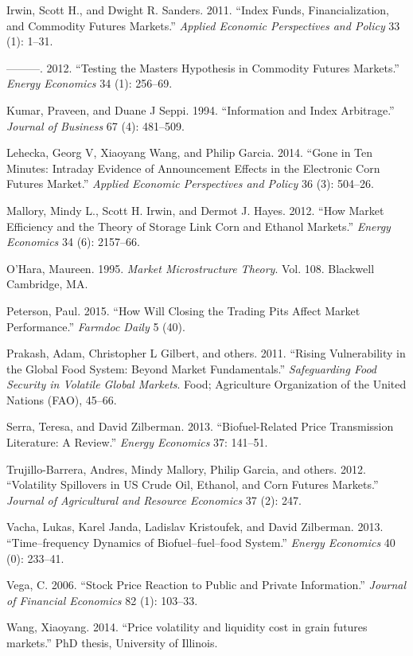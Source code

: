 \documentclass[review,12pt]{elsarticle}
\begin{document}
\begin{linenumbers}
Irwin, Scott H., and Dwight R. Sanders. 2011. ``Index Funds,
Financialization, and Commodity Futures Markets.'' \emph{Applied
Economic Perspectives and Policy} 33 (1): 1--31.

---------. 2012. ``Testing the Masters Hypothesis in Commodity Futures
Markets.'' \emph{Energy Economics} 34 (1): 256--69.

Kumar, Praveen, and Duane J Seppi. 1994. ``Information and Index
Arbitrage.'' \emph{Journal of Business} 67 (4): 481--509.

Lehecka, Georg V, Xiaoyang Wang, and Philip Garcia. 2014. ``Gone in Ten
Minutes: Intraday Evidence of Announcement Effects in the Electronic
Corn Futures Market.'' \emph{Applied Economic Perspectives and Policy}
36 (3): 504--26.

Mallory, Mindy L., Scott H. Irwin, and Dermot J. Hayes. 2012. ``How
Market Efficiency and the Theory of Storage Link Corn and Ethanol
Markets.'' \emph{Energy Economics} 34 (6): 2157--66.

O'Hara, Maureen. 1995. \emph{Market Microstructure Theory}. Vol. 108.
Blackwell Cambridge, MA.

Peterson, Paul. 2015. ``How Will Closing the Trading Pits Affect Market
Performance.'' \emph{Farmdoc Daily} 5 (40).

Prakash, Adam, Christopher L Gilbert, and others. 2011. ``Rising
Vulnerability in the Global Food System: Beyond Market Fundamentals.''
\emph{Safeguarding Food Security in Volatile Global Markets}. Food;
Agriculture Organization of the United Nations (FAO), 45--66.

Serra, Teresa, and David Zilberman. 2013. ``Biofuel-Related Price
Transmission Literature: A Review.'' \emph{Energy Economics} 37:
141--51.

Trujillo-Barrera, Andres, Mindy Mallory, Philip Garcia, and others.
2012. ``Volatility Spillovers in US Crude Oil, Ethanol, and Corn Futures
Markets.'' \emph{Journal of Agricultural and Resource Economics} 37 (2):
247.

Vacha, Lukas, Karel Janda, Ladislav Kristoufek, and David Zilberman.
2013. ``Time--frequency Dynamics of Biofuel--fuel--food System.''
\emph{Energy Economics} 40 (0): 233--41.

Vega, C. 2006. ``Stock Price Reaction to Public and Private
Information.'' \emph{Journal of Financial Economics} 82 (1): 103--33.

Wang, Xiaoyang. 2014. ``Price volatility and liquidity cost in grain
futures markets.'' PhD thesis, University of Illinois.


\end{linenumbers}
\end{document}
